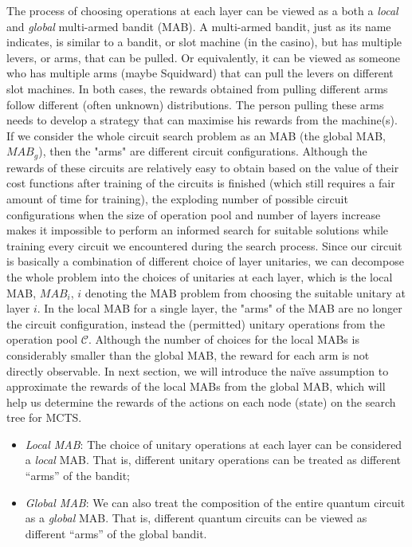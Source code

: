 \documentclass[a4paper,onecolumn,11pt]{quantumarticle}
\begin{document}
The process of choosing operations at each layer can be viewed as a both a \textit{local} and \textit{global} multi-armed bandit (MAB). A multi-armed bandit, just as its name indicates, is similar to a bandit, or slot machine (in the casino), but has multiple levers, or arms, that can be pulled. Or equivalently, it can be viewed as someone who has multiple arms (maybe Squidward) that can pull the levers on different slot machines. In both cases, the rewards obtained from pulling different arms follow different (often unknown) distributions. The person pulling these arms needs to develop a strategy that can maximise his rewards from the machine(s). If we consider the whole circuit search problem as an MAB (the global MAB, $MAB_g$), then the "arms" are different circuit configurations. Although the rewards of these circuits are relatively easy to obtain based on the value of their cost functions after training of the circuits is finished (which still requires a fair amount of time for training), the exploding number of possible circuit configurations when the size of operation pool and number of layers increase makes it impossible to perform an informed search for suitable solutions while training every circuit we encountered during the search process. Since our circuit is basically a combination of different choice of layer unitaries, we can decompose the whole problem into the choices of unitaries at each layer, which is the local MAB, $MAB_i$, $i$ denoting the MAB problem from choosing the suitable unitary at layer $i$. In the local MAB for a single layer, the "arms" of the MAB are no longer the circuit configuration, instead the (permitted) unitary operations from the operation pool $\mathcal{C}$. Although the number of choices for the local MABs is considerably smaller than the global MAB, the reward for each arm is not directly observable. In next section, we will introduce the na\"ive assumption \cite{CMAB_RTS} to approximate the rewards of the local MABs from the global MAB, which will help us determine the rewards of the actions on each node (state) on the search tree for MCTS.



\begin{itemize}
    \item \textit{Local MAB}: The choice of unitary operations at each layer can be considered a \textit{local} MAB. That is, different unitary operations can be treated as different ``arms'' of the bandit;
    \item \textit{Global MAB}: We can also treat the composition of the entire quantum circuit as a \textit{global} MAB. That is, different quantum circuits can be viewed as different ``arms'' of the global bandit.
\end{itemize}
\end{document}
